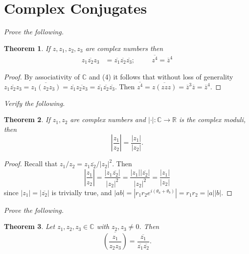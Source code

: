 \documentclass[letter]{article}
\newtheorem{theorem}{Theorem}
\newenvironment{menumerate}{%
  \edef\backupindent{\the\parindent}%
  \enumerate%
  \setlength{\parindent}{\backupindent}%
}{\endenumerate}
\begin{document}
\section{Complex Conjugates}
 
\begin{menumerate}
	\setcounter{enumi}{3} 
	\item \emph{Prove the following.}
	\begin{theorem}
		If $z, z_1, z_2, z_3$ are complex numbers then
		\begin{equation}
			\begin{aligned}
				\overline{z_1z_2z_3} &= \overline{z_1}\overline{z_2}\overline{z_3};&\;\;\; &  \overline{z^4} = \overline{z}^4
			\end{aligned}	
		\end{equation}
	\end{theorem}
	\begin{proof}
		By associativity of $\mathbb{C}$ and (4) it follows that without loss of generality $\overline{z_1z_2z_3} = \overline{z_1(z_2z_3)} = \overline{z_1}\overline{z_2z_3} = \overline{z_1}\overline{z_2}\overline{z_3}.$ Then $\overline{z^4} = \overline{z(zzz)} = \overline{z}^3\overline{z} = \overline{z}^4.$
	\end{proof}
	\item \emph{Verify the following.}
	\begin{theorem}
		If $z_1, z_2$ are complex numbers and $|\cdot|: \mathbb{C} \to \mathbb{R}$ is the complex moduli, then
		\begin{equation}
			\left|\frac{z_1}{z_2}\right| = \frac{|z_1|}{|z_2|}.
		 \end{equation} 
	\end{theorem}
	\begin{proof}
		Recall that $z_1/z_2 = z_1\overline{z_2}/|z_2|^2.$ Then
		\begin{equation}
			\left|\frac{z_1}{z_2}\right| = \frac{|z_1\overline{z_2}|}{|z_2|^2} = \frac{|z_1||\overline{z_2}|}{|z_2|^2} = \frac{|z_1|}{|z_2|}
		\end{equation}
		since $|z_1| = |\overline{z_2}|$ is trivially true, and $|ab| = \left|r_1r_2e^{i(\theta_a+\theta_b)}\right| = r_1r_2 = |a||b|.$
	\end{proof}
	\item \emph{Prove the following.}
	\begin{theorem}
		Let $z_1, z_2, z_3 \in \mathbb{C}$ with $z_2, z_3 \neq 0$. Then 
		\begin{equation}
			\overline{\left(\frac{z_1}{z_2z_3}\right)} = \frac{\overline{z_1}}{\overline{z_1}\overline{z_2}}.

\end{equation}
\end{theorem}
\end{menumerate}
\end{document}
